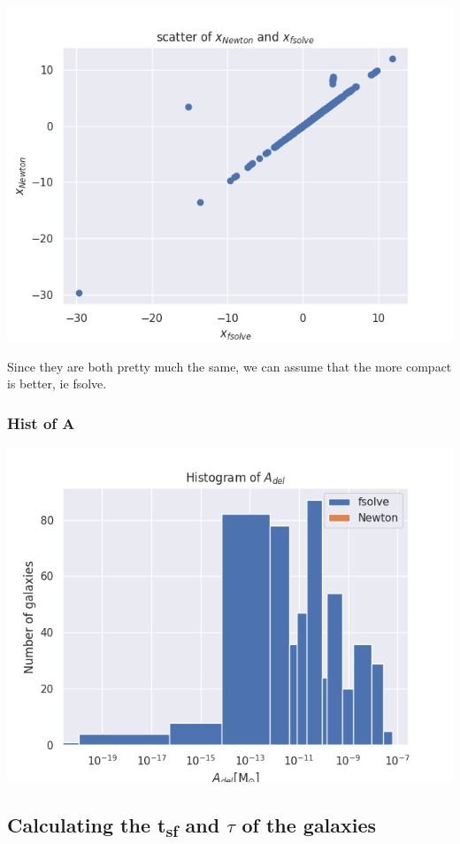 \documentclass[a4paper]{article}
\begin{document}
\begin{center}
\includegraphics[width=.9\linewidth]{figure/x-scatter.png}
\end{center}


Since they are both pretty much the same, we can assume that the more compact is better, ie fsolve.

\subsubsection{Hist of A}
\label{sec:orgb536f22}

\begin{center}
\includegraphics[width=.9\linewidth]{figure/A-hist.png}
\end{center}


\subsection{Calculating the t\textsubscript{sf} and \(\tau\) of the galaxies}
\label{sec:org06b21d0}
\end{document}

